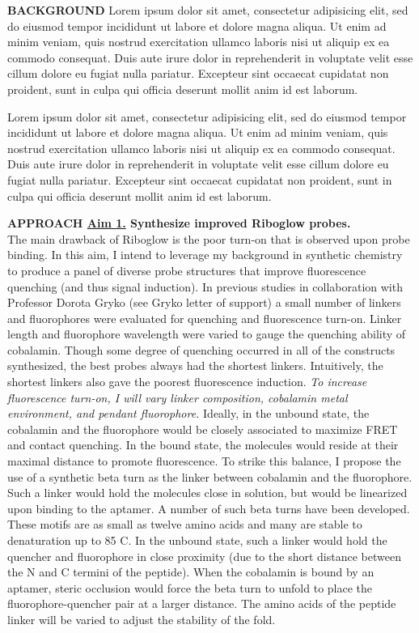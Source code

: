 \textbf{BACKGROUND}
Lorem ipsum dolor sit amet, consectetur adipisicing elit, sed do eiusmod tempor incididunt ut labore et dolore magna aliqua. Ut enim ad minim veniam, quis nostrud exercitation ullamco laboris nisi ut aliquip ex ea commodo consequat. Duis aute irure dolor in reprehenderit in voluptate velit esse cillum dolore eu fugiat nulla pariatur. Excepteur sint occaecat cupidatat non proident, sunt in culpa qui officia deserunt mollit anim id est laborum.

Lorem ipsum dolor sit amet, consectetur adipisicing elit, sed do eiusmod tempor incididunt ut labore et dolore magna aliqua. Ut enim ad minim veniam, quis nostrud exercitation ullamco laboris nisi ut aliquip ex ea commodo consequat. Duis aute irure dolor in reprehenderit in voluptate velit esse cillum dolore eu fugiat nulla pariatur. Excepteur sint occaecat cupidatat non proident, sunt in culpa qui officia deserunt mollit anim id est laborum.

\textbf{APPROACH \underline{Aim 1.} Synthesize improved Riboglow probes.}\\
The main drawback of Riboglow is the poor turn-on that is observed upon probe binding. In this aim, I intend to leverage my background in synthetic chemistry to produce a panel of diverse probe structures that improve fluorescence quenching (and thus signal induction). In previous studies in collaboration with Professor Dorota Gryko (see Gryko letter of support) a small number of linkers and fluorophores were evaluated for quenching and fluorescence turn-on. Linker length and fluorophore wavelength were varied to gauge the quenching ability of cobalamin. Though some degree of quenching occurred in all of the constructs synthesized, the best probes always had the shortest linkers. Intuitively, the shortest linkers also gave the poorest fluorescence induction.
\textit{To increase fluorescence turn-on, I will vary linker composition,  cobalamin metal environment, and pendant fluorophore.} 
Ideally, in the unbound state, the cobalamin and the fluorophore would be closely associated to maximize FRET and contact quenching.\cite{LeeDesignSynthesisCharacterization2009} In the bound state, the molecules would reside at their maximal distance to promote fluorescence. To strike this balance, I propose the use of a synthetic beta turn as the linker between cobalamin and the fluorophore. Such a linker would hold the molecules close in solution, but would be linearized upon binding to the aptamer. A number of such beta turns have been developed. These motifs are as small as twelve amino acids and many are stable to denaturation up to 85 C.\cite{KierProbingLowerSize2008} In the unbound state, such a linker would hold the quencher and fluorophore in close proximity (due to the short distance between the N and C termini of the peptide). When the cobalamin is bound by an aptamer, steric occlusion would force the beta turn to unfold to place the fluorophore-quencher pair at a larger distance. The amino acids of the peptide linker will be varied to adjust the stability of the fold.

